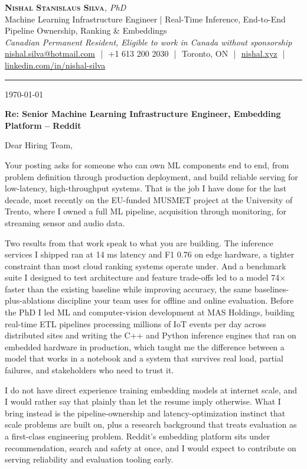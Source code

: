 \documentclass[11pt]{article}
\newcommand{\clName}{Nishal Stanislaus Silva}
\newcommand{\clStatus}{Canadian Permanent Resident, Eligible to work in Canada without sponsorship}
\newcommand{\clTagline}{Machine Learning Infrastructure Engineer | Real-Time Inference, End-to-End Pipeline Ownership, Ranking \& Embeddings}
\newcommand{\clRole}{Senior Machine Learning Infrastructure Engineer, Embedding Platform}
\newcommand{\clCompany}{Reddit}
\begin{document}
\pagestyle{empty}
\begin{center}
    {\LARGE \scshape \textbf{\clName}}{\large \textit{, PhD}}
    \\[1pt]
    {\small \clTagline}
    \\[1pt]
    {\footnotesize\textit{\clStatus}}
    \\[1pt]
    {\small
    \href{mailto:nishal.silva@hotmail.com}{nishal.silva@hotmail.com}
    \,\,|\,\, +1 613 200 2030
    \,\,|\,\, Toronto, ON
    \,\,|\,\, \href{https://nishal.xyz}{nishal.xyz}
    \,\,|\,\, \href{https://www.linkedin.com/in/nishal-silva}{linkedin.com/in/nishal-silva}}
\end{center}

\rule{\linewidth}{0.4pt}\vspace{0.6em}

\today

\textbf{Re: \clRole{} -- \clCompany{}}

Dear Hiring Team,

Your posting asks for someone who can own ML components end to end, from problem definition through production deployment, and build reliable serving for low-latency, high-throughput systems. That is the job I have done for the last decade, most recently on the EU-funded MUSMET project at the University of Trento, where I owned a full ML pipeline, acquisition through monitoring, for streaming sensor and audio data.

Two results from that work speak to what you are building. The inference services I shipped ran at 14 ms latency and F1 0.76 on edge hardware, a tighter constraint than most cloud ranking systems operate under. And a benchmark suite I designed to test architecture and feature trade-offs led to a model 74$\times$ faster than the existing baseline while improving accuracy, the same baselines-plus-ablations discipline your team uses for offline and online evaluation. Before the PhD I led ML and computer-vision development at MAS Holdings, building real-time ETL pipelines processing millions of IoT events per day across distributed sites and writing the C++ and Python inference engines that ran on embedded hardware in production, which taught me the difference between a model that works in a notebook and a system that survives real load, partial failures, and stakeholders who need to trust it.

I do not have direct experience training embedding models at internet scale, and I would rather say that plainly than let the resume imply otherwise. What I bring instead is the pipeline-ownership and latency-optimization instinct that scale problems are built on, plus a research background that treats evaluation as a first-class engineering problem. Reddit's embedding platform sits under recommendation, search and safety at once, and I would expect to contribute on serving reliability and evaluation tooling early.
\end{document}

